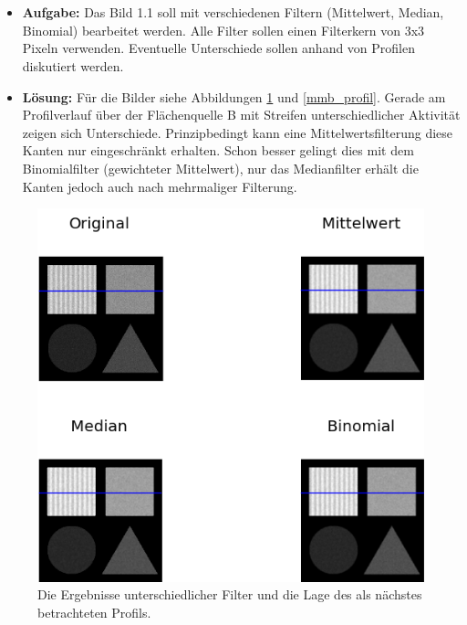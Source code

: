 \documentclass[12pt, a4paper, twoside]{report}
\begin{document}
\section{}
\begin{itemize}
\csname c@topnumber
\item \textbf{Aufgabe:} Das Bild 1.1 soll mit verschiedenen Filtern (Mittelwert, Median, Binomial) bearbeitet werden. Alle Filter sollen einen Filterkern von 3x3 Pixeln verwenden. Eventuelle Unterschiede sollen anhand von Profilen diskutiert werden.
\item \textbf{Lösung:} Für die Bilder siehe Abbildungen \ref{mmb} und \ref{mmb_profil}. Gerade am Profilverlauf über der Flächenquelle B mit Streifen unterschiedlicher Aktivität zeigen sich Unterschiede. Prinzipbedingt kann eine Mittelwertsfilterung diese Kanten nur eingeschränkt erhalten. Schon besser gelingt dies mit dem Binomialfilter (gewichteter Mittelwert), nur das Medianfilter erhält die Kanten jedoch auch nach mehrmaliger Filterung.
\end{itemize}

\begin{figure}
\centering
\includegraphics[width=\textwidth]{../bilder/mmb_lage.png}
\caption{Die Ergebnisse unterschiedlicher Filter und die Lage des als nächstes betrachteten Profils.}
\label{mmb}
\end{figure}
\end{document}
